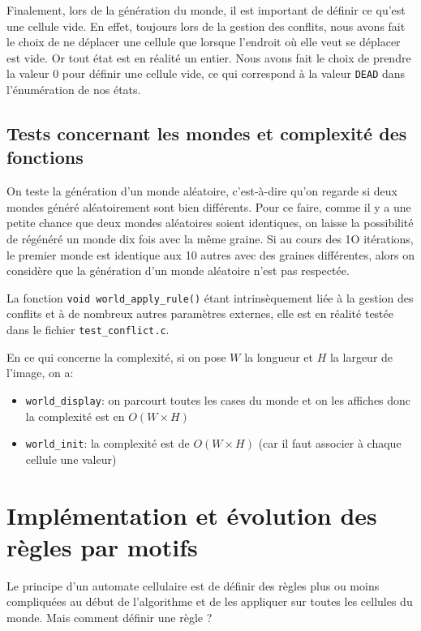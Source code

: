 Finalement, lors de la génération du monde, il est important de définir ce qu'est une cellule vide. En effet, toujours lors de la gestion des conflits, nous avons fait le choix de ne déplacer une cellule que lorsque l'endroit où elle veut se déplacer est vide. Or tout état est en réalité un entier. Nous avons fait le choix de prendre la valeur 0 pour définir une cellule vide, ce qui correspond à la valeur \texttt{DEAD} dans l'énumération de nos états.

\subsection{Tests concernant les mondes et complexité des fonctions} \label{sec:ReglesMotif}

On teste la génération d'un monde aléatoire, c'est-à-dire qu'on regarde si deux mondes généré aléatoirement sont bien différents. Pour ce faire, comme il y a une petite chance que deux mondes aléatoires soient identiques, on laisse la possibilité de régénéré un monde dix fois avec la même graine. Si au cours des 1O itérations, le premier monde est identique aux 10 autres avec des graines différentes, alors on considère que la génération d'un monde aléatoire n'est pas respectée.

La fonction \lstinline{void world_apply_rule()} étant intrinsèquement liée à la gestion des conflits et à de nombreux autres paramètres externes, elle est en réalité testée dans le fichier \texttt{test\_conflict.c}.

En ce qui concerne la complexité, si on pose $W$ la longueur et $H$ la largeur de l'image, on a:
\begin{itemize}
    \item \lstinline{world_display}: on parcourt toutes les cases du monde et on les affiches donc la complexité est en $O(W\times H)$
    \item \lstinline{world_init}: la complexité est de $O(W\times H)$ (car il faut associer à chaque cellule une valeur)
\end{itemize}

\section{Implémentation et évolution des règles par motifs}

Le principe d'un automate cellulaire est de définir des règles plus ou moins compliquées au début de l'algorithme et de les appliquer sur toutes les cellules du monde. Mais comment définir une règle ?

